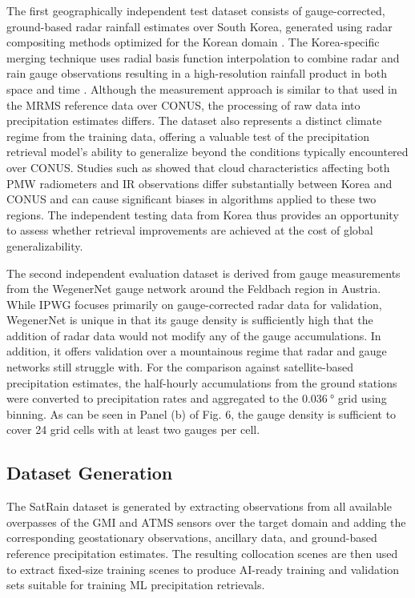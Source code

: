 \documentclass[11pt]{article}
\begin{document}
The first geographically independent test dataset consists of gauge-corrected,
ground-based radar rainfall estimates over South Korea, generated using radar
compositing methods optimized for the Korean domain
\citep{Kwon2015RadarComparison}. The Korea-specific merging technique uses
radial basis function interpolation to combine radar and rain gauge observations
resulting in a high-resolution rainfall product in both space and time
\citep{Ryu2025RBFMerging}. Although the measurement approach is similar to that
used in the MRMS reference data over CONUS, the processing of raw data into
precipitation estimates differs. The dataset also represents a distinct climate
regime from the training data, offering a valuable test of the precipitation
retrieval model’s ability to generalize beyond the conditions typically
encountered over CONUS. Studies such as \cite{Sohn2013WarmRain} showed that
cloud characteristics affecting both PMW radiometers and IR observations differ
substantially between Korea and CONUS and can cause significant biases in
algorithms applied to these two regions. The independent testing data from Korea
thus provides an opportunity to assess whether retrieval improvements are
achieved at the cost of global generalizability.

The second independent evaluation dataset is derived from gauge measurements
from the WegenerNet \citep{Fuchsberger2021WegenerNet} gauge network around the
Feldbach region in Austria. While IPWG focuses primarily on gauge-corrected
radar data for validation, WegenerNet is unique in that its gauge density is
sufficiently high that the addition of radar data would not modify any of the
gauge accumulations. In addition, it offers validation over a mountainous regime
that radar and gauge networks still struggle with. For the comparison against
satellite-based precipitation estimates, the half-hourly accumulations from the
ground stations were converted to precipitation rates and aggregated to the
$\SI{0.036}{\degree}$ grid using binning. As can be seen in Panel (b) of Fig. 6,
the gauge density is sufficient to cover 24 grid cells with at least two gauges
per cell.


\subsection{Dataset Generation}

The SatRain dataset is generated by extracting observations from all available
overpasses of the GMI and ATMS sensors over the target domain and adding the
corresponding geostationary observations, ancillary data, and ground-based
reference precipitation estimates. The resulting collocation scenes are then
used to extract fixed-size training scenes to produce AI-ready training and
validation sets suitable for training ML precipitation retrievals.
\end{document}

